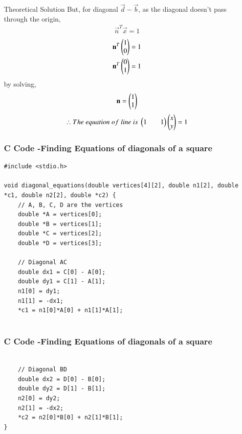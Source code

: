 \documentclass{beamer}
\begin{document}
\begin{frame}{Theoretical Solution}
But, for diagonal $\vec{d}-\vec{b}$, as the diagonal doesn't pass through the origin,
\begin{align*}
    \vec{n}^T\vec{x}=1
\end{align*}
\begin{align*}
    \mathbf{n}^T\begin{pmatrix}1\\0\end{pmatrix}=1\\
    \mathbf{n}^T\begin{pmatrix}0\\1\end{pmatrix}=1
\end{align*} 
by solving,
\begin{align*}
    \mathbf{n}=\begin{pmatrix}1\\1\end{pmatrix}
\end{align*}
\begin{align*}
    \therefore The\;equation\;of\;line\;is\;\begin{pmatrix}1&&1\end{pmatrix}\begin{pmatrix}x\\y\end{pmatrix}=1
\end{align*}
\end{frame}

\begin{frame}[fragile]
    \frametitle{C Code -Finding Equations of diagonals of a square}

    \begin{lstlisting}
#include <stdio.h>

void diagonal_equations(double vertices[4][2], double n1[2], double *c1, double n2[2], double *c2) {
    // A, B, C, D are the vertices
    double *A = vertices[0];
    double *B = vertices[1];
    double *C = vertices[2];
    double *D = vertices[3];

    // Diagonal AC
    double dx1 = C[0] - A[0];
    double dy1 = C[1] - A[1];
    n1[0] = dy1;
    n1[1] = -dx1;
    *c1 = n1[0]*A[0] + n1[1]*A[1];


    \end{lstlisting}
\end{frame}

\begin{frame}[fragile]
    \frametitle{C Code -Finding Equations of diagonals of a square}

    \begin{lstlisting}

    // Diagonal BD
    double dx2 = D[0] - B[0];
    double dy2 = D[1] - B[1];
    n2[0] = dy2;
    n2[1] = -dx2;
    *c2 = n2[0]*B[0] + n2[1]*B[1];
}
    \end{lstlisting}
\end{frame}
\end{document}

